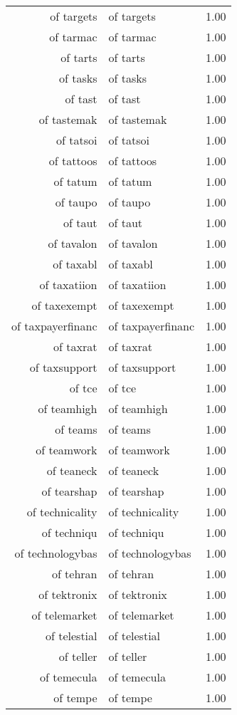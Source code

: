 \begin{table}[ht]
\begin{tabular}{rlr}
  of targets & of targets & 1.00 \\ 
  of tarmac & of tarmac & 1.00 \\ 
  of tarts & of tarts & 1.00 \\ 
  of tasks & of tasks & 1.00 \\ 
  of tast & of tast & 1.00 \\ 
  of tastemak & of tastemak & 1.00 \\ 
  of tatsoi & of tatsoi & 1.00 \\ 
  of tattoos & of tattoos & 1.00 \\ 
  of tatum & of tatum & 1.00 \\ 
  of taupo & of taupo & 1.00 \\ 
  of taut & of taut & 1.00 \\ 
  of tavalon & of tavalon & 1.00 \\ 
  of taxabl & of taxabl & 1.00 \\ 
  of taxatiion & of taxatiion & 1.00 \\ 
  of taxexempt & of taxexempt & 1.00 \\ 
  of taxpayerfinanc & of taxpayerfinanc & 1.00 \\ 
  of taxrat & of taxrat & 1.00 \\ 
  of taxsupport & of taxsupport & 1.00 \\ 
  of tce & of tce & 1.00 \\ 
  of teamhigh & of teamhigh & 1.00 \\ 
  of teams & of teams & 1.00 \\ 
  of teamwork & of teamwork & 1.00 \\ 
  of teaneck & of teaneck & 1.00 \\ 
  of tearshap & of tearshap & 1.00 \\ 
  of technicality & of technicality & 1.00 \\ 
  of techniqu & of techniqu & 1.00 \\ 
  of technologybas & of technologybas & 1.00 \\ 
  of tehran & of tehran & 1.00 \\ 
  of tektronix & of tektronix & 1.00 \\ 
  of telemarket & of telemarket & 1.00 \\ 
  of telestial & of telestial & 1.00 \\ 
  of teller & of teller & 1.00 \\ 
  of temecula & of temecula & 1.00 \\ 
  of tempe & of tempe & 1.00 \\ 

\end{tabular}
\end{table}
